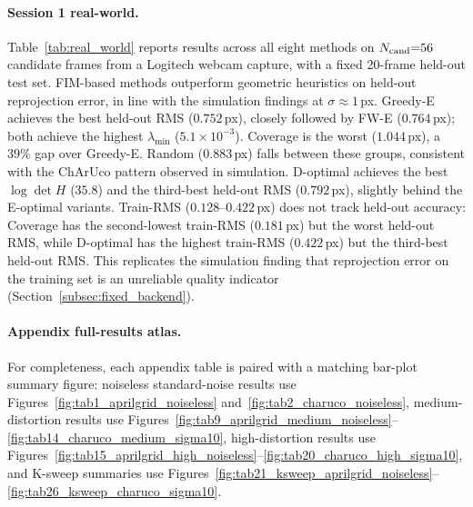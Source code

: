 \documentclass[letterpaper, 9
 pt, conference]{ieeeconf}
\begin{document}
\paragraph{Session 1 real-world.}
Table~\ref{tab:real_world} reports results across all eight methods on
$N_{\rm cand}{=}56$ candidate frames from a Logitech webcam capture, with a
fixed 20-frame held-out test set.
FIM-based methods outperform geometric heuristics on held-out reprojection
error, in line with the simulation findings at $\sigma{\approx}1$\,px.
Greedy-E achieves the best held-out RMS ($0.752$\,px), closely followed by
FW-E ($0.764$\,px); both achieve the highest $\lambda_{\min}$
($5.1\!\times\!10^{-3}$).
Coverage is the worst ($1.044$\,px), a $39\%$ gap over Greedy-E.
Random ($0.883$\,px) falls between these groups, consistent with the
ChArUco pattern observed in simulation.
D-optimal achieves the best $\log\det H$ ($35.8$) and the third-best held-out
RMS ($0.792$\,px), slightly behind the E-optimal variants.
Train-RMS ($0.128$--$0.422$\,px) does not track held-out accuracy:
Coverage has the second-lowest train-RMS ($0.181$\,px) but the worst
held-out RMS, while D-optimal has the highest train-RMS ($0.422$\,px) but
the third-best held-out RMS. This replicates the simulation
finding that reprojection error on the training set is an unreliable
quality indicator (Section~\ref{subsec:fixed_backend}).

\paragraph{Appendix full-results atlas.}
For completeness, each appendix table is paired with a matching bar-plot
summary figure: noiseless standard-noise results use
Figures~\ref{fig:tab1_aprilgrid_noiseless} and~\ref{fig:tab2_charuco_noiseless},
medium-distortion results use
Figures~\ref{fig:tab9_aprilgrid_medium_noiseless}--\ref{fig:tab14_charuco_medium_sigma10},
high-distortion results use
Figures~\ref{fig:tab15_aprilgrid_high_noiseless}--\ref{fig:tab20_charuco_high_sigma10},
and K-sweep summaries use
Figures~\ref{fig:tab21_ksweep_aprilgrid_noiseless}--\ref{fig:tab26_ksweep_charuco_sigma10}.
\end{document}
